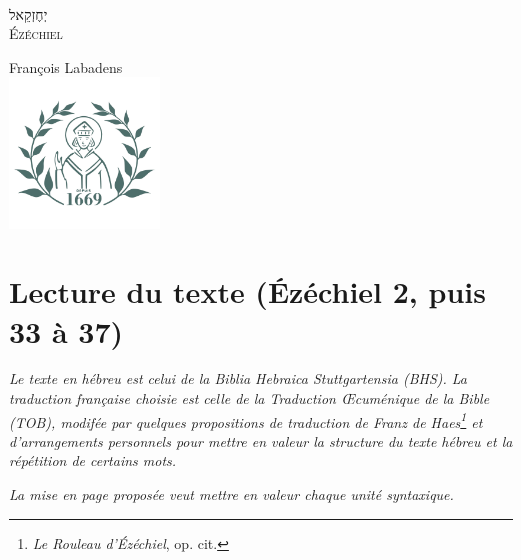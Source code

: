 \documentclass[12pt,a4paper,titlepage]{article}
\author{}
\date{}
\begin{document}
\thispagestyle{empty} %

~
\vspace{10em}
\begin{center}
\fontsize{60}{70}\selectfont \texthebrew{יְחֶזְקֵאל}\\
\fontsize{50}{40}\selectfont \textsc{Ézéchiel} \par
\normalsize François Labadens \\
\vfill
\includegraphics[width=4cm]{../assets/seminaire_lyon.png}
\end{center}

\newpage
\setcounter{page}{2} %

\newpage

\vspace{2em}

\newpage

\newpage

\newpage

\vspace{2em}
\section*{Lecture du texte (Ézéchiel 2, puis 33 à 37)}
\textit{Le texte en hébreu est celui de la Biblia Hebraica Stuttgartensia (BHS).
La traduction française choisie est celle de la Traduction Œcuménique de la Bible (TOB), modifée par quelques propositions de traduction de Franz de Haes\footnote{\textit{Le Rouleau d'Ézéchiel}, op. cit.} et d'arrangements personnels pour mettre en valeur la structure du texte hébreu et la répétition de certains mots.}\par
\textit{La mise en page proposée veut mettre en valeur chaque unité syntaxique.}
\newpage 

\end{document}
